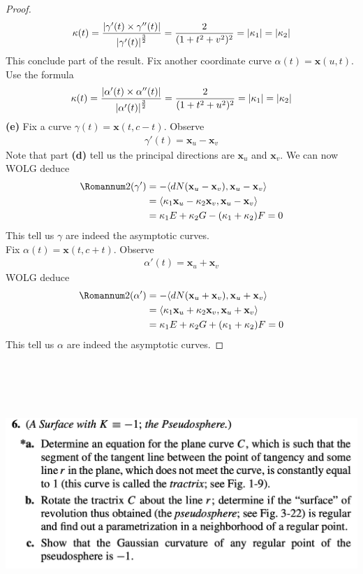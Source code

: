 \documentclass{report}
\begin{document}
\begin{proof}
\begin{align*}
\kappa (t)= \frac{\left|\gamma '(t)\times \gamma ''(t)\right|}{\left|\gamma '(t)\right|^{\frac{3}{2}}}= \frac{2}{(1+t^2+v^2)^2}=\left|\kappa_1\right|=\left|\kappa_2\right|
\end{align*}
This conclude part of the result. Fix another coordinate curve $\alpha (t)=\textbf{x}(u,t)$. Use the formula 
\begin{align*}
\kappa(t)= \frac{\left|\alpha '(t)\times \alpha ''(t)\right|}{\left|\alpha  '(t)\right|^{\frac{3}{2}}}= \frac{2}{(1+t^2+u^2)^2}=\left|\kappa_1\right|=\left|\kappa_2\right|
\end{align*}
\textbf{(e)} Fix a curve $\gamma (t)=\textbf{x}(t,c-t)$. Observe 
\begin{align*}
\gamma '(t)=\textbf{x}_u - \textbf{x}_v
\end{align*}
Note that part \textbf{(d)} tell us the principal directions are $\textbf{x}_u$ and $\textbf{x}_v$. We can now WOLG deduce 
 \begin{align*}
\Sec (\gamma ')&=-\langle dN(\textbf{x}_u- \textbf{x}_v),\textbf{x}_u -\textbf{x}_v\rangle \\
&=\langle \kappa_1 \textbf{x}_u - \kappa_2\textbf{x}_v , \textbf{x}_u -\textbf{x}_v\rangle \\
&= \kappa_1 E + \kappa_2 G - (\kappa_1 +\kappa_2)F=0
\end{align*}
This tell us $\gamma $ are indeed the asymptotic curves. \\

Fix $\alpha  (t)=\textbf{x}(t,c+t)$. Observe 
\begin{align*}
\alpha  '(t)=\textbf{x}_u + \textbf{x}_v
\end{align*}
WOLG deduce 
\begin{align*}
\Sec (\alpha ')&= - \langle dN(\textbf{x}_u + \textbf{x}_v), \textbf{x}_u + \textbf{x}_v\rangle \\
&= \langle \kappa_1 \textbf{x}_u + \kappa_2 \textbf{x}_v , \textbf{x}_u + \textbf{x}_v \rangle \\
&=\kappa_1 E+ \kappa_2 G+ (\kappa_1 +\kappa_2)F=0
\end{align*}
This tell us $\alpha $ are indeed the asymptotic curves.
\end{proof}
\begin{question}{}{}
\includegraphics[height=10cm,width=18cm]{hw5q9}
\end{question}
\end{document}
